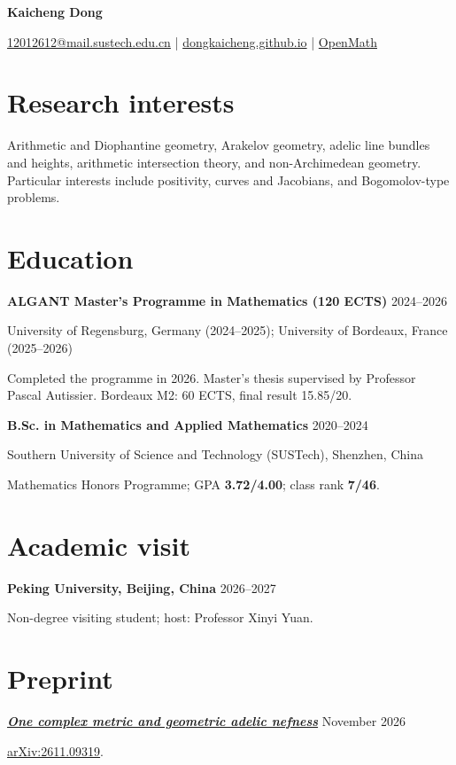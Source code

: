 \documentclass[10pt,letterpaper]{article}
\newcommand{\rightdate}[1]{\hfill{\footnotesize\sffamily\color{muted} #1}}
\newcommand{\entrytitle}[2]{\needspace{3\baselineskip}\textbf{#1}\rightdate{#2}\par}
\newcommand{\subnote}[1]{{\color{muted}#1}\par}
\newcommand{\indented}[1]{\begin{list}{}{\setlength{\leftmargin}{1.05em}\setlength{\rightmargin}{0em}\setlength{\topsep}{0pt}\setlength{\itemsep}{0pt}\setlength{\parsep}{0pt}}\item #1\end{list}}
\begin{document}
\begin{center}
{\fontsize{25}{29}\selectfont\sffamily\bfseries Kaicheng Dong}\par
\vspace{5pt}
{\sffamily\small
\href{mailto:12012612@mail.sustech.edu.cn}{12012612@mail.sustech.edu.cn}
\enspace\textcolor{rule}{|}\enspace
\href{https://dongkaicheng.github.io/}{dongkaicheng.github.io}
\enspace\textcolor{rule}{|}\enspace
\href{https://openmath-atlas.org/}{OpenMath}
}\par
\end{center}
\vspace{-7pt}
\section*{Research interests}
Arithmetic and Diophantine geometry, Arakelov geometry, adelic line bundles and heights, arithmetic intersection theory, and non-Archimedean geometry. Particular interests include positivity, curves and Jacobians, and Bogomolov-type problems.

\section*{Education}
\entrytitle{ALGANT Master's Programme in Mathematics (120 ECTS)}{2024--2026}
\subnote{University of Regensburg, Germany (2024--2025); University of Bordeaux, France (2025--2026)}
\indented{Completed the programme in 2026. Master's thesis supervised by Professor Pascal Autissier. Bordeaux M2: 60 ECTS, final result 15.85/20.}
\vspace{4pt}
\entrytitle{B.Sc. in Mathematics and Applied Mathematics}{2020--2024}
\subnote{Southern University of Science and Technology (SUSTech), Shenzhen, China}
\indented{Mathematics Honors Programme; GPA \textbf{3.72/4.00}; class rank \textbf{7/46}.}

\section*{Academic visit}
\entrytitle{Peking University, Beijing, China}{2026--2027}
\indented{Non-degree visiting student; host: Professor Xinyi Yuan.}

\section*{Preprint}
\entrytitle{\href{https://arxiv.org/abs/2611.09319}{\emph{One complex metric and geometric adelic nefness}}}{November 2026}
\subnote{\href{https://arxiv.org/abs/2611.09319}{arXiv:2611.09319}.}
\end{document}

